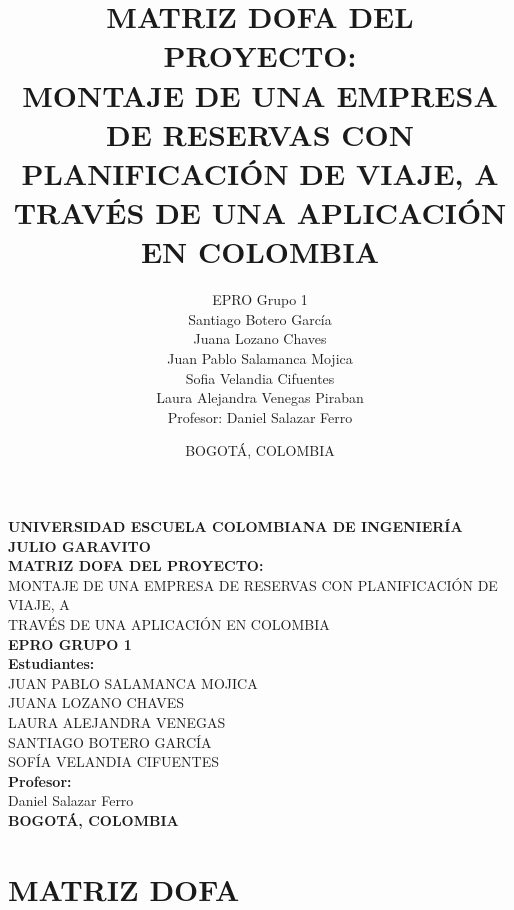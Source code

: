 \documentclass[12pt,a4paper]{article}
\title{\textbf{MATRIZ DOFA DEL PROYECTO:}\\
MONTAJE DE UNA EMPRESA DE RESERVAS CON PLANIFICACIÓN DE VIAJE, A\\
TRAVÉS DE UNA APLICACIÓN EN COLOMBIA}
\author{EPRO Grupo 1\\
    \small Santiago Botero García\\
    \small Juana Lozano Chaves\\
    \small Juan Pablo Salamanca Mojica\\
    \small Sofia Velandia Cifuentes\\
    \small Laura Alejandra Venegas Piraban\\
    \vspace{0.5cm}
    \small Profesor: Daniel Salazar Ferro}
\date{BOGOTÁ, COLOMBIA}
\newcommand{\sectiontitle}[1]{\section{#1}}
\begin{document}
\begin{titlepage}
    \centering
    \vspace*{2cm}
    
    {\Large\textbf{UNIVERSIDAD ESCUELA COLOMBIANA DE INGENIERÍA JULIO GARAVITO}}\\[1cm]
    
    {\Large\textbf{MATRIZ DOFA DEL PROYECTO:}}\\[0.5cm]
    {\Large MONTAJE DE UNA EMPRESA DE RESERVAS CON PLANIFICACIÓN DE VIAJE, A}\\[0.3cm]
    {\Large TRAVÉS DE UNA APLICACIÓN EN COLOMBIA}\\[2cm]
    
    {\large\textbf{EPRO GRUPO 1}}\\[1.5cm]
    
    \textbf{Estudiantes:}\\[0.5cm]
    JUAN PABLO SALAMANCA MOJICA\\
    JUANA LOZANO CHAVES\\
    LAURA ALEJANDRA VENEGAS\\
    SANTIAGO BOTERO GARCÍA\\
    SOFÍA VELANDIA CIFUENTES\\[1.5cm]
    
    \textbf{Profesor:}\\[0.5cm]
    Daniel Salazar Ferro\\[2cm]
    
    \textbf{BOGOTÁ, COLOMBIA}
    
    \vfill
\end{titlepage}

\tableofcontents
\newpage

\sectiontitle{MATRIZ DOFA}
\end{document}
